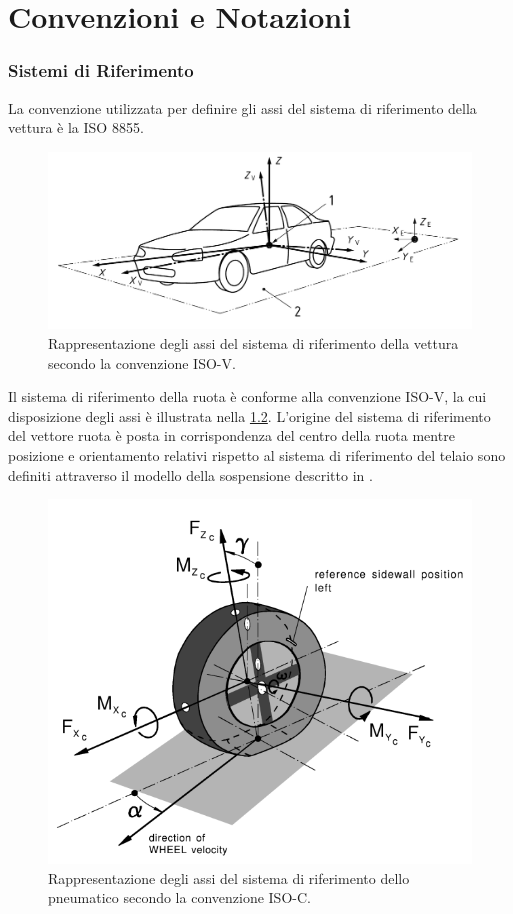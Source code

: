 \chapter{Convenzioni e Notazioni}
\label{Notazioni}
%
\subsection{Sistemi di Riferimento}
La convenzione utilizzata per definire gli assi del sistema di riferimento della vettura è la \ac{ISO} 8855.

\begin{figure}[h!]
	\centering
	\includegraphics[width=0.8\linewidth]{Figures/iso_convention}
	\caption{Rappresentazione degli assi del sistema di riferimento della vettura secondo la convenzione ISO-V.}
	\label{isoconventionv}
\end{figure}

\noindent
Il sistema di riferimento della ruota è conforme alla convenzione \ac{ISO}-V, la cui disposizione degli assi è illustrata nella \figurename{ \ref{isoconventionc}}. L'origine del sistema di riferimento del vettore ruota è posta in corrispondenza del centro della ruota mentre posizione e orientamento relativi rispetto al sistema di riferimento del telaio sono definiti attraverso il modello della sospensione descritto in \cite{Larcher}.

\begin{figure}[h!]
	\centering
	\includegraphics[width=0.6\linewidth]{Figures/iso_convention_wheel}
	\caption{Rappresentazione degli assi  del sistema di riferimento dello pneumatico secondo la convenzione ISO-C.}
	\label{isoconventionc}
\end{figure}
%
